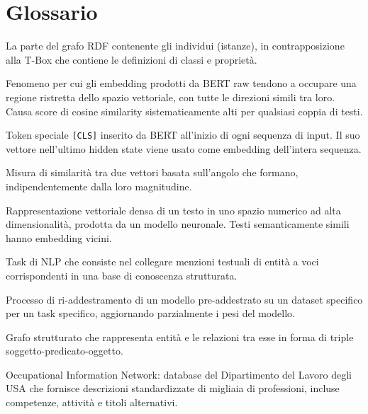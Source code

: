 \documentclass[12pt, a4paper]{report}
\begin{document}
% 
\chapter{Glossario}
% 

\begin{description}[style=nextline]
  \item[A-Box (Assertional Box)]
    La parte del grafo RDF contenente gli individui (istanze), in
    contrapposizione alla T-Box che contiene le definizioni di classi
    e proprietà.

  \item[Anisotropy]
    Fenomeno per cui gli embedding prodotti da BERT raw tendono a
    occupare una regione ristretta dello spazio vettoriale, con tutte
    le direzioni simili tra loro. Causa score di cosine similarity
    sistematicamente alti per qualsiasi coppia di testi.

  \item[CLS token]
    Token speciale \texttt{[CLS]} inserito da BERT all'inizio di ogni
    sequenza di input. Il suo vettore nell'ultimo hidden state viene
    usato come embedding dell'intera sequenza.

  \item[Cosine Similarity]
    Misura di similarità tra due vettori basata sull'angolo che
    formano, indipendentemente dalla loro magnitudine.

  \item[Embedding]
    Rappresentazione vettoriale densa di un testo in uno spazio
    numerico ad alta dimensionalità, prodotta da un modello
    neuronale. Testi semanticamente simili hanno embedding vicini.

  \item[Entity Linking]
    Task di NLP che consiste nel collegare menzioni testuali di
    entità a voci corrispondenti in una base di conoscenza strutturata.

  \item[Fine-tuning]
    Processo di ri-addestramento di un modello pre-addestrato su un
    dataset specifico per un task specifico, aggiornando parzialmente
    i pesi del modello.

  \item[Knowledge Graph]
    Grafo strutturato che rappresenta entità e le relazioni tra esse
    in forma di triple soggetto-predicato-oggetto.

  \item[O*NET]
    Occupational Information Network: database del Dipartimento del
    Lavoro degli USA che fornisce descrizioni standardizzate di
    migliaia di professioni, incluse competenze, attività e titoli
    alternativi.


\end{description}
\end{document}
